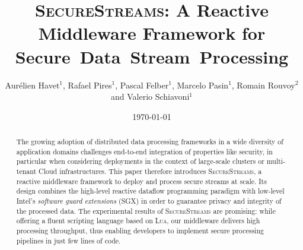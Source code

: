 \documentclass[systeme]{compas2017}
\newcommand{\SYS}{\textsc{SecureStreams}\xspace}
\begin{document}
\title{\SYS: A Reactive Middleware Framework for Secure~Data~Stream~Processing}
\shorttitle{\SYS}

\author{Aurélien Havet$^1$, Rafael Pires$^1$, Pascal Felber$^1$, Marcelo Pasin$^1$, Romain Rouvoy$^2$ and Valerio Schiavoni$^1$}%

\address{$^1$~University of Neuchâtel, Switzerland. Email: first.last@unine.ch\\
$^2$~Univ. Lille / Inria / IUF, France. Email: romain.rouvoy@univ-lille.fr}

\date{\today}

\maketitle

\begin{abstract}
The growing adoption of distributed data processing frameworks in a wide diversity of application domains challenges end-to-end integration of properties like security, in particular when considering deployments in the context of large-scale clusters or multi-tenant Cloud infrastructures.
% 
This paper therefore introduces \SYS{}, a reactive middleware framework to deploy and process secure streams at scale.
Its design combines the high-level reactive dataflow programming paradigm with low-level Intel's \emph{software guard extensions} (SGX) in order to guarantee privacy and integrity of the processed data.
The experimental results of \SYS{} are promising: while offering a fluent scripting language based on \textsc{Lua}, our middleware delivers high processing throughput, thus enabling developers to implement secure processing pipelines in just few lines of code.
\end{abstract}









\end{document}
